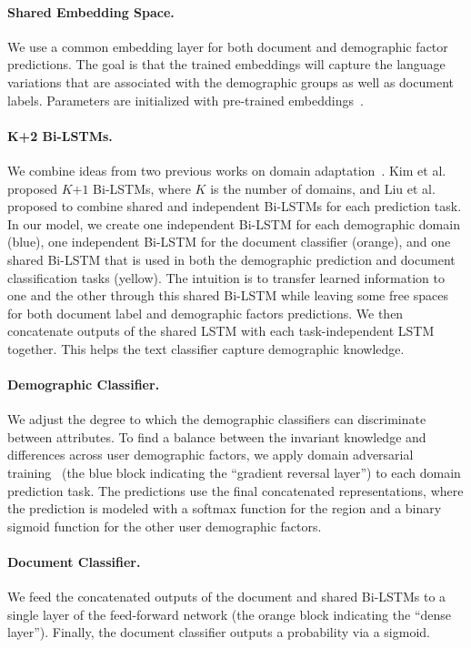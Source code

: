 \paragraph{Shared Embedding Space.} 
We use a common embedding layer for both document and demographic factor predictions. The goal is that the trained embeddings will capture the language variations that are associated with the demographic groups as well as document labels. Parameters are initialized with pre-trained embeddings~\cite{mikolov2013distributed, pennington2014glove}.

\paragraph{K+2 Bi-LSTMs.} 
We combine ideas from two previous works on domain adaptation~\cite{liu2017adversarial, kim2017domain}. Kim et al.~\cite{kim2017domain} proposed $K$$+$$1$ Bi-LSTMs, where $K$ is the number of domains, and Liu et al.~\cite{liu2017adversarial} proposed to combine shared and independent Bi-LSTMs for each prediction task. In our model, we create one independent Bi-LSTM for each demographic domain (blue), one independent Bi-LSTM for the document classifier (orange), and one shared Bi-LSTM that is used in both the demographic prediction and document classification tasks (yellow). The intuition is to transfer learned information to one and the other through this shared Bi-LSTM while leaving some free spaces for both document label and demographic factors predictions. We then concatenate outputs of the shared LSTM with each task-independent LSTM together. This helps the text classifier capture demographic knowledge.

\paragraph{Demographic Classifier.} 
We adjust the degree to which the demographic classifiers can discriminate between attributes. 
To find a balance between the invariant knowledge and differences across user demographic factors, we apply domain adversarial training~\cite{ganin2016domain} (the blue block indicating the ``gradient reversal layer'') to each domain prediction task. The predictions use the final concatenated representations, where the prediction is modeled with a {softmax} function for the region and a binary {sigmoid} function for the other user demographic factors. 

\paragraph{Document Classifier.} 
We feed the concatenated outputs of the document and shared Bi-LSTMs to a single layer of the feed-forward network (the orange block indicating the ``dense layer''). Finally, the document classifier outputs a probability via a sigmoid.

